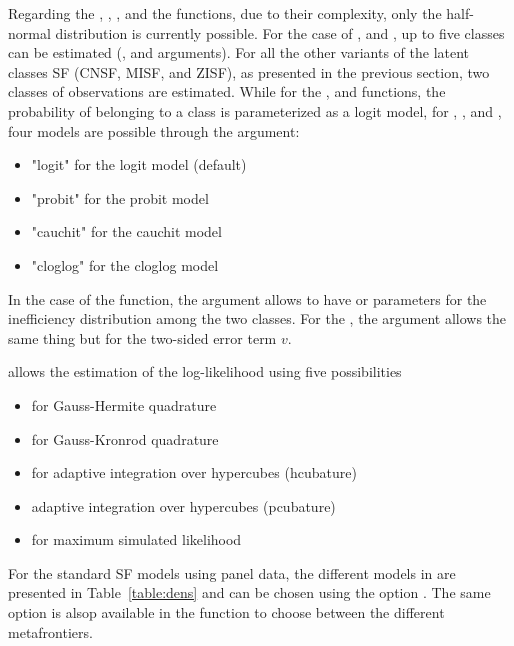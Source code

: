 \documentclass[nojss]{jss}
\begin{document}
Regarding the , , , 
and the  functions, due to their complexity, only the half-normal 
distribution is currently possible. For the case of , and 
, up to five classes can be estimated (, 
and  arguments). For all the other variants of the latent
classes SF (CNSF, MISF, and ZISF), as presented in the previous section, two 
classes of observations are estimated. While for the , 
 and  functions, the probability of belonging to a class is 
parameterized as a logit model, for , , and
, four models are possible through the  argument:
%
\begin{itemize} \itemsep 10pt
\item "logit" for the logit model (default)
\item "probit" for the probit model
\item "cauchit" for the cauchit model
\item "cloglog" for the cloglog model
\end{itemize}
%
In the case of the  function, the  argument
allows to have  or  parameters for the 
inefficiency distribution among the two classes. For the , 
the argument  allows the same thing but for the two-sided error
term $v$.

 allows the estimation of the log-likelihood using 
five possibilities
%
\begin{itemize} \itemsep 10pt
\item {} for Gauss-Hermite quadrature
\item {} for Gauss-Kronrod quadrature
\item {} for adaptive integration over hypercubes (hcubature)
\item {} adaptive integration over hypercubes (pcubature)
\item {} for maximum simulated likelihood
\end{itemize}
%
For the standard SF models using panel data, the different models in 
are presented in Table~\ref{table:dens} and can be chosen using the option
. The same option is alsop available in the function 
to choose between the different metafrontiers.
\end{document}
